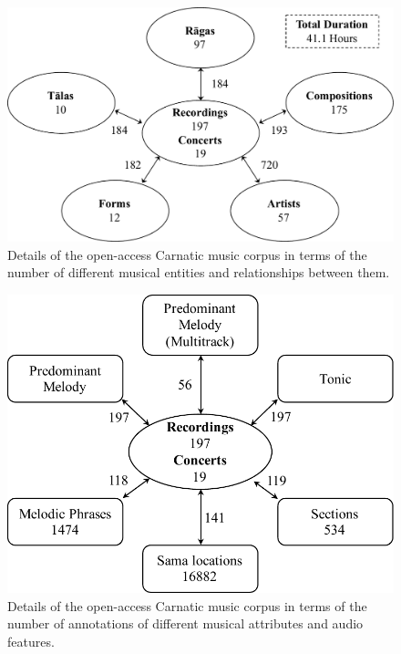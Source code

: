 \begin{figure}
	\begin{center}
		\includegraphics[width=\figSizeNinety]{ch04_datasets/figures/carnatic_corpus_cc.pdf}
	\end{center}
	\caption[Details of the open-access Carnatic music corpus]{Details of the open-access Carnatic music corpus in terms of the number of different musical entities and relationships between them.}
	\label{fig:carnatic_cc_corpus_details}
\end{figure}

\begin{figure}
	\begin{center}
		\includegraphics[width=\figSizeSeventyFive]{ch04_datasets/figures/carnatic_CC_details.pdf}
	\end{center}
	\caption[Details of the open-access Carnatic music corpus]{Details of the open-access Carnatic music corpus in terms of the number of annotations of different musical attributes and audio features.}
	\label{fig:carnatic_open_access_corpus_details_annotations}
\end{figure}


